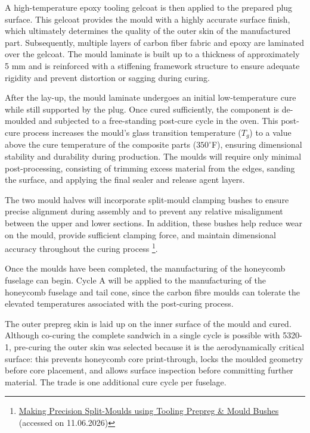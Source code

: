 A high-temperature epoxy tooling gelcoat is then applied to the prepared plug surface. This gelcoat provides the mould with a highly accurate surface finish, which ultimately determines the quality of the outer skin of the manufactured part. Subsequently, multiple layers of carbon fiber fabric and epoxy are laminated over the gelcoat. The mould laminate is built up to a thickness of approximately 5 mm and is reinforced with a stiffening framework structure to ensure adequate rigidity and prevent distortion or sagging during curing.

After the lay-up, the mould laminate undergoes an initial low-temperature cure while still supported by the plug. Once cured sufficiently, the component is de-moulded and subjected to a free-standing post-cure cycle in the oven. This post-cure process increases the mould's glass transition temperature ($T_g$) to a value above the cure temperature of the composite parts ($350^\circ$F), ensuring dimensional stability and durability during production. The moulds will require only minimal post-processing, consisting of trimming excess material from the edges, sanding the surface, and applying the final sealer and release agent layers.

The two mould halves will incorporate split-mould clamping bushes to ensure precise alignment during assembly and to prevent any relative misalignment between the upper and lower sections. In addition, these bushes help reduce wear on the mould, provide sufficient clamping force, and maintain dimensional accuracy throughout the curing process \footnote{\href{https://www.easycomposites.co.uk/learning/precision-split-moulds-using-tooling-prepreg}{Making Precision Split-Moulds using Tooling Prepreg \& Mould Bushes} (accessed on 11.06.2026)}.

Once the moulds have been completed, the manufacturing of the honeycomb fuselage can begin. Cycle A will be applied to the manufacturing of the honeycomb fuselage and tail cone, since the carbon fibre moulds can tolerate the elevated temperatures associated with the post-curing process.

The outer prepreg skin is laid up on the inner surface of the mould and cured. Although co-curing the complete sandwich in a single cycle is possible with 5320-1, pre-curing the outer skin was selected because it is the aerodynamically critical surface: this prevents honeycomb core print-through, locks the moulded geometry before core placement, and allows surface inspection before committing further material. The trade is one additional cure cycle per fuselage. 

